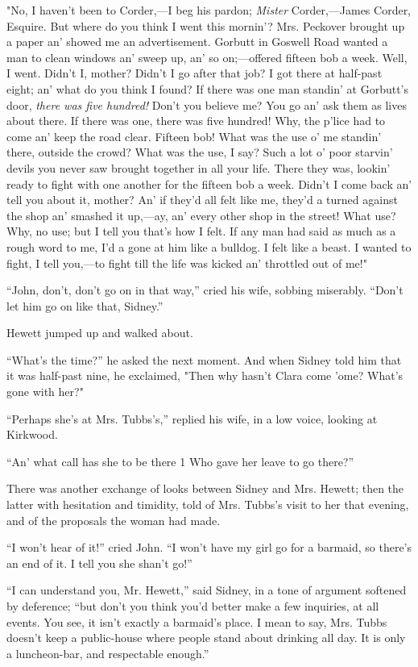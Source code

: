 "No, I haven't been to Corder,---I beg his pardon; \emph{Mister}
Corder,---James Corder, Esquire. But where do you think I went this
mornin'? Mrs. Peckover brought up a paper an' showed me an
advertisement. Gorbutt in Goswell Road wanted a man to clean windows an'
sweep up, an' so on;---offered fifteen bob a week. Well, I went. Didn't
I, mother? Didn't I go after that job? I got there at half-past eight;
an' what do you think I found? If there was one man standin' at
Gorbutt's door, \emph{there was five hundred!} Don't you believe me? You
go an' ask them as lives about there. If there was one, there was five
hundred! Why, the p'lice had to come an' keep the {}road clear. Fifteen
bob! What was the use o' me standin' there, outside the crowd? What was
the use, I say? Such a lot o' poor starvin' devils you never saw brought
together in all your life. There they was, lookin' ready to fight with
one another for the fifteen bob a week. Didn't I come back an' tell you
about it, mother? An' if they'd all felt like me, they'd a turned
against the shop an' smashed it up,---ay, an' every other shop in the
street! What use? Why, no use; but I tell you that's how I felt. If any
man had said as much as a rough word to me, I'd a gone at him like a
bulldog. I felt like a beast. I wanted to fight, I tell you,---to fight
till the life was kicked an' throttled out of me!"

``John, don't, don't go on in that way,'' cried his wife, sobbing
miserably. ``Don't let him go on like that, Sidney.''

Hewett jumped up and walked about.

``What's the time?'' he asked the next moment. And when Sidney told him
that it was half-past nine, he exclaimed, "Then {}why hasn't Clara come
'ome? What's gone with her?"

``Perhaps she's at Mrs. Tubbs's,'' replied his wife, in a low voice,
looking at Kirkwood.

``An' what call has she to be there 1 Who gave her leave to go there?''

There was another exchange of looks between Sidney and Mrs. Hewett; then
the latter with hesitation and timidity, told of Mrs. Tubbs's visit to
her that evening, and of the proposals the woman had made.

``I won't hear of it!'' cried John. ``I won't have my girl go for a
barmaid, so there's an end of it. I tell you she shan't go!''

``I can understand you, Mr. Hewett,'' said Sidney, in a tone of argument
softened by deference; ``but don't you think you'd better make a few
inquiries, at all events. You see, it isn't exactly a barmaid's place. I
mean to say, Mrs. Tubbs doesn't keep a public-house where people stand
about drinking all day. It is only a luncheon-bar, and respectable
enough.''

